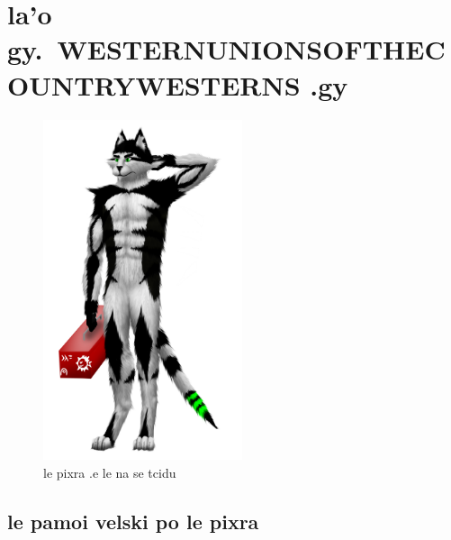 \documentclass{report}
\newcommand\imageheight{10cm}
\begin{document}
\chapter{la'o gy.\ WESTERNUNIONSOFTHECOUNTRYWESTERNS .gy}
\begin{figure}[ht]
	\centering
	\includegraphics[height=\imageheight]{50x/toolbox/westernunionsofthecountrywesterns.png}
	\caption[center]{le pixra .e le na se tcidu}
\end{figure}
\section{le pamoi velski po le pixra}
\end{document}
